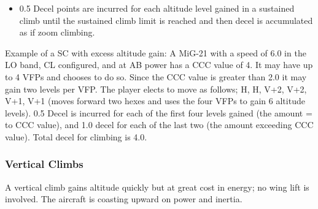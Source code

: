 \begin{itemize}
    \item{} 0.5 Decel points are incurred for each altitude level gained in a sustained climb until the sustained climb limit is reached and then decel is accumulated as if zoom climbing. 



\end{itemize}

Example of a SC with excess altitude gain: A MiG-21 with a speed of 6.0 in the LO band, CL configured, and at AB power has a CCC value of 4. It may have up to 4 VFPs and chooses to do so. Since the CCC value is greater than 2.0 it may gain two levels per VFP. The player elects to move as follows; H, H, V+2, V+2, V+1, V+1 (moves forward two hexes and uses the four VFPs to gain 6 altitude levels). 0.5 Decel is incurred for each of the first four levels gained (the amount = to CCC value), and 1.0 decel for each of the last two (the amount exceeding CCC value). Total decel for climbing is 4.0.
    
\subsubsection{Vertical Climbs}

A vertical climb gains altitude quickly but at great cost in energy; no wing lift is involved. The aircraft is coasting upward on power and inertia.

